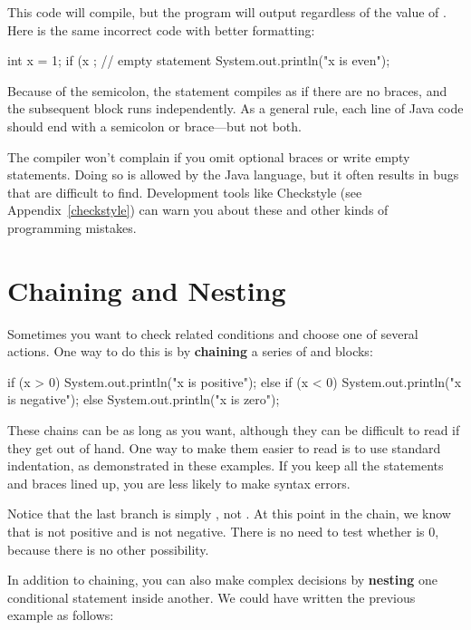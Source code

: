 This code will compile, but the program will output  regardless of the value of .
Here is the same incorrect code with better formatting:

\begin{code}
int x = 1;
if (x %
    ;  // empty statement
{
    System.out.println("x is even");
}
\end{code}

Because of the semicolon, the  statement compiles as if there are no braces, and the subsequent block runs independently.
As a general rule, each line of Java code should end with a semicolon or brace---but not both.

The compiler won't complain if you omit optional braces or write empty statements.
Doing so is allowed by the Java language, but it often results in bugs that are difficult to find.
Development tools like Checkstyle (see Appendix~\ref{checkstyle}) can warn you about these and other kinds of programming mistakes.


\section{Chaining and Nesting}


Sometimes you want to check related conditions and choose one of several actions.
One way to do this is by {\bf chaining} a series of  and  blocks:

\begin{code}
if (x > 0) {
    System.out.println("x is positive");
} else if (x < 0) {
    System.out.println("x is negative");
} else {
    System.out.println("x is zero");
}
\end{code}

These chains can be as long as you want, although they can be difficult to read if they get out of hand.
One way to make them easier to read is to use standard indentation, as demonstrated in these examples.
If you keep all the statements and braces lined up, you are less likely to make syntax errors.

Notice that the last branch is simply , not .
At this point in the chain, we know that  is not positive and  is not negative.
There is no need to test whether  is 0, because there is no other possibility.


In addition to chaining, you can also make complex decisions by {\bf nesting} one conditional statement inside another.
We could have written the previous example as follows:

